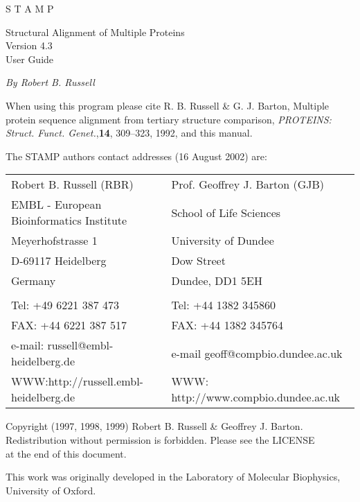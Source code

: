 \begin{titlepage}
\begin{center}
\begin{bf}
\begin{Huge}
S T A M P\\
\end{Huge}
\begin{Large}
Structural Alignment of Multiple Proteins \\
Version 4.3\\
User Guide\\
\end{Large}
\end{bf}
\vskip 0.25in

{\em By Robert B. Russell}\\
\end{center}
\vskip 0.25in

\noindent
When using this program please cite R. B. Russell \& G. J.  Barton, 
Multiple protein sequence alignment from tertiary structure 
comparison, {\em PROTEINS: Struct. Funct. Genet.},{\bf 14}, 
309--323, 1992, and this manual.\\

\vskip 0.25in

The STAMP authors contact addresses (16 August 2002) are:

\vskip 0.1in

\begin{tabular}{ll}
Robert B. Russell (RBR)		         & Prof. Geoffrey J. Barton (GJB)\\
EMBL - European Bioinformatics Institute & School of Life Sciences\\
Meyerhofstrasse 1                        & University of Dundee\\
D-69117 Heidelberg                       & Dow Street\\
Germany                                  & Dundee, DD1 5EH\\
                                         & \\
Tel: +49 6221 387 473                    & Tel: +44 1382 345860\\
FAX: +44 6221 387 517                    & FAX: +44 1382 345764\\
e-mail: russell@embl-heidelberg.de       & e-mail geoff@compbio.dundee.ac.uk\\
WWW:http://russell.embl-heidelberg.de    & WWW: http://www.compbio.dundee.ac.uk \\
\end{tabular}
\vskip 0.25in
\noindent
\begin{center}
Copyright (1997, 1998, 1999) Robert B. Russell \& Geoffrey J. Barton.\\
Redistribution without permission is forbidden.  Please see the LICENSE\\
at the end of this document.

\vskip 0.1in

This work was originally developed in the Laboratory of Molecular
Biophysics, University of Oxford.
\noindent

\end{center}

\end{titlepage}

